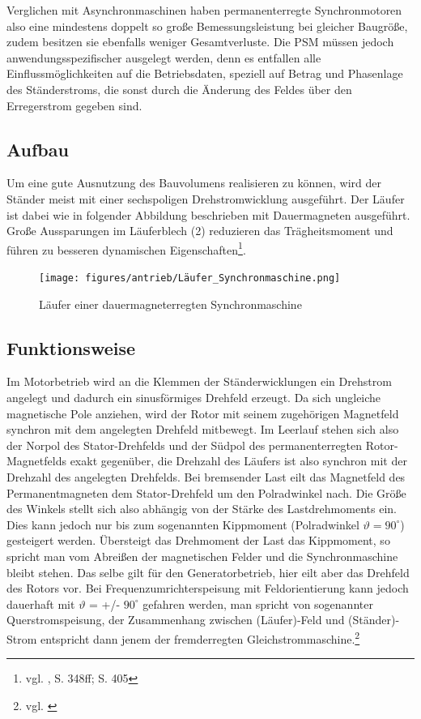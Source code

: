 Verglichen mit Asynchronmaschinen haben permanenterregte Synchronmotoren also eine mindestens doppelt so große Bemessungsleistung bei gleicher Baugröße, zudem besitzen sie ebenfalls weniger Gesamtverluste. Die PSM müssen jedoch anwendungsspezifischer ausgelegt werden, denn es entfallen alle Einflussmöglichkeiten auf die Betriebsdaten, speziell auf Betrag und Phasenlage des Ständerstroms, die sonst durch die Änderung des Feldes über den Erregerstrom gegeben sind.

\subsection{Aufbau}
Um eine gute Ausnutzung des Bauvolumens realisieren zu können, wird der Ständer meist mit einer sechspoligen Drehstromwicklung ausgeführt. Der Läufer ist dabei wie in folgender Abbildung beschrieben mit Dauermagneten ausgeführt. Große Aussparungen im Läuferblech (2) reduzieren das Trägheitsmoment und führen zu besseren dynamischen Eigenschaften\footnote{vgl. \cite{Fischer}, S. 348ff; S. 405}.
\\[3mm]
\begin{figure}[H]
	\begin{center}
		\texttt{[image: figures/antrieb/Läufer\_Synchronmaschine.png]}
		\caption{Läufer einer dauermagneterregten Synchronmaschine\cite{Fischer}}
	\end{center}
\end{figure}

\subsection{Funktionsweise}
Im Motorbetrieb wird an die Klemmen der Ständerwicklungen ein Drehstrom angelegt und dadurch ein sinusförmiges Drehfeld erzeugt. Da sich ungleiche magnetische Pole anziehen, wird der Rotor mit seinem zugehörigen Magnetfeld synchron mit dem angelegten Drehfeld mitbewegt. Im Leerlauf stehen sich also der Norpol des Stator-Drehfelds und der Südpol des permanenterregten Rotor-Magnetfelds exakt gegenüber, die Drehzahl des Läufers ist also synchron mit der Drehzahl des angelegten Drehfelds. Bei bremsender Last eilt das Magnetfeld des Permanentmagneten dem Stator-Drehfeld um den Polradwinkel nach. Die Größe des Winkels stellt sich also abhängig von der Stärke des Lastdrehmoments ein. Dies kann jedoch nur bis zum sogenannten Kippmoment (Polradwinkel $\vartheta = 90^\circ$) gesteigert werden. Übersteigt das Drehmoment der Last das Kippmoment, so spricht man vom \glqq Abreißen\grqq{} der magnetischen Felder und die Synchronmaschine bleibt stehen. Das selbe gilt für den Generatorbetrieb, hier eilt aber das Drehfeld des Rotors vor. Bei Frequenzumrichterspeisung mit Feldorientierung kann jedoch dauerhaft mit $\vartheta$ = +/- $90^\circ$ gefahren werden, man spricht von sogenannter Querstromspeisung, der Zusammenhang zwischen (Läufer)-Feld und (Ständer)-Strom entspricht dann jenem der fremderregten Gleichstrommaschine.\footnote{vgl. \cite{Synchronmaschine}}

